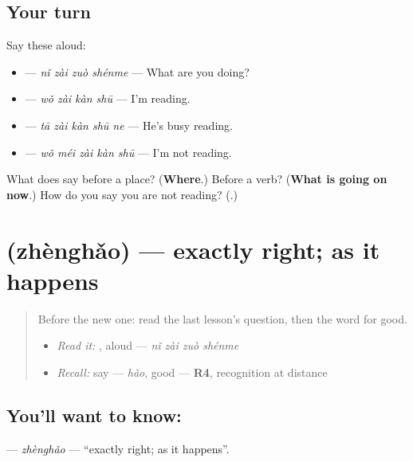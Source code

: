 \subsection*{Your turn}
Say these aloud:

\begin{itemize}
\raggedright
  \item {} — \emph{nǐ zài zuò shénme} — What are you doing?
  \item {} — \emph{wǒ zài kàn shū} — I'm reading.
  \item {} — \emph{tā zài kàn shū ne} — He's busy reading.
  \item {} — \emph{wǒ méi zài kàn shū} — I'm not reading.
\end{itemize}

\begin{tcolorbox}[breakable,colback=teal!4,colframe=teal!35!black,title={Before you move on}]
What does  say before a place? (\textbf{Where}.) Before a verb? (\textbf{What is going on now}.) How do you say you are not reading? (\textbf{}.)
\end{tcolorbox}
\section[\texorpdfstring{\zh{正好} (zhènghǎo)}{正好 (zhènghǎo)}]{ (zhènghǎo) — exactly right; as it happens}

\label{lesson:ZH-C149-zhenghao}



\begin{quote}
Before the new one: read the last lesson's question, then the word for good.

\begin{itemize}
\raggedright
  \item \emph{Read it:} , aloud — \emph{nǐ zài zuò shénme}
  \item \emph{Recall:} say  — \emph{hǎo}, good — \textbf{R4}, recognition at distance
\end{itemize}
\end{quote}

\subsection*{You'll want to know: }
\textbf{} — \emph{zhènghǎo} — \textquotedblleft{}exactly right; as it happens\textquotedblright{}.

